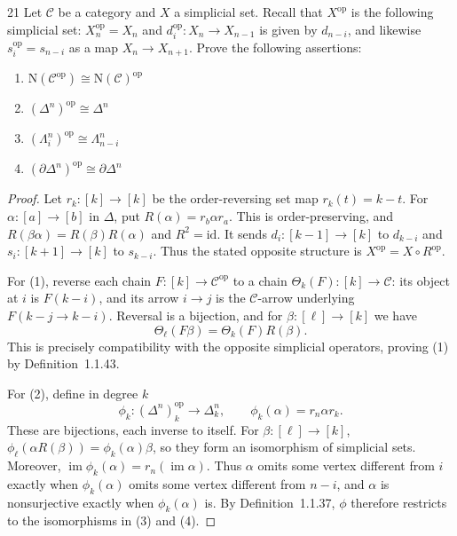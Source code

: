 \begin{exercise}{21}
Let $\mathcal C$ be a category and $X$ a simplicial set. Recall that
$X^{\mathrm{op}}$ is the following simplicial set:
$X_n^{\mathrm{op}}=X_n$ and
$d_i^{\mathrm{op}}\colon X_n\to X_{n-1}$ is given by $d_{n-i}$,
and likewise $s_i^{\mathrm{op}}=s_{n-i}$ as a map $X_n\to X_{n+1}$.
Prove the following assertions:
\begin{enumerate}[label=(\arabic*),leftmargin=*,itemsep=0pt,parsep=0pt,
                  topsep=.5\baselineskip]
 \item $\mathrm N(\mathcal C^{\mathrm{op}})\cong
        \mathrm N(\mathcal C)^{\mathrm{op}}$
 \item $(\Delta^n)^{\mathrm{op}}\cong\Delta^n$
 \item $(\Lambda_i^n)^{\mathrm{op}}\cong\Lambda_{n-i}^n$
 \item $(\partial\Delta^n)^{\mathrm{op}}\cong\partial\Delta^n$
\end{enumerate}

\begin{proof}
Let $r_k\colon[k]\to[k]$ be the order-reversing set map
$r_k(t)=k-t$. For $\alpha\colon[a]\to[b]$ in $\Delta$, put
$R(\alpha)=r_b\alpha r_a$. This is order-preserving, and
$R(\beta\alpha)=R(\beta)R(\alpha)$ and $R^2=\mathrm{id}$.
It sends $d_i\colon[k-1]\to[k]$ to $d_{k-i}$ and
$s_i\colon[k+1]\to[k]$ to $s_{k-i}$. Thus the stated opposite
structure is $X^{\mathrm{op}}=X\circ R^{\mathrm{op}}$.

For (1), reverse each chain $F\colon[k]\to\mathcal C^{\mathrm{op}}$
to a chain $\Theta_k(F)\colon[k]\to\mathcal C$: its object at $i$
is $F(k-i)$, and its arrow $i\to j$ is the $\mathcal C$-arrow
underlying $F(k-j\to k-i)$. Reversal is a bijection, and for
$\beta\colon[\ell]\to[k]$ we have
\[
 \Theta_\ell(F\beta)=\Theta_k(F)R(\beta).
\]
This is precisely compatibility with the opposite simplicial
operators, proving (1) by Definition~1.1.43.

For (2), define in degree $k$
\[
 \phi_k\colon(\Delta^n)^{\mathrm{op}}_k\longrightarrow\Delta^n_k,
 \qquad \phi_k(\alpha)=r_n\alpha r_k.
\]
These are bijections, each inverse to itself. For
$\beta\colon[\ell]\to[k]$,
$\phi_\ell(\alpha R(\beta))=\phi_k(\alpha)\beta$, so they form
an isomorphism of simplicial sets.
Moreover, $\operatorname{im}\phi_k(\alpha)=r_n(\operatorname{im}\alpha)$.
Thus $\alpha$ omits some vertex different from $i$ exactly when
$\phi_k(\alpha)$ omits some vertex different from $n-i$, and
$\alpha$ is nonsurjective exactly when $\phi_k(\alpha)$ is.
By Definition~1.1.37, $\phi$ therefore restricts to the
isomorphisms in (3) and (4).
\end{proof}
\end{exercise}

